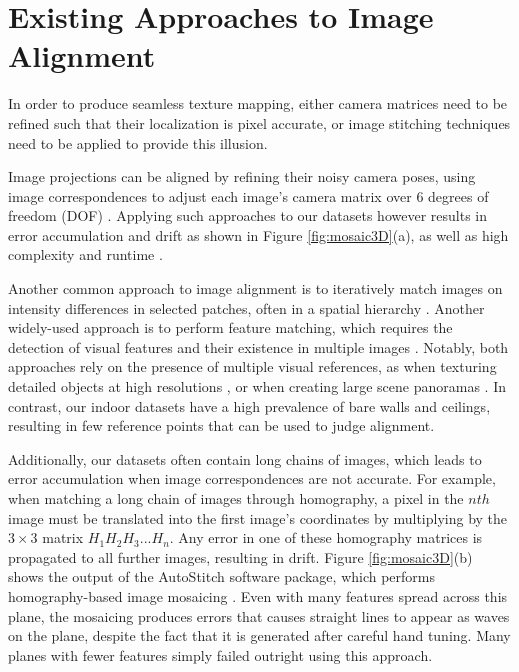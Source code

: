 \message{ !name(oldpaper.tex)}\documentclass[10pt,twocolumn,letterpaper]{article}
\begin{document}
\section{Existing Approaches to Image Alignment}
\label{sec:existingApproaches}
In order to produce seamless texture mapping, either camera matrices
need to be refined such that their localization is pixel accurate, or
image stitching techniques need to be applied to provide this
illusion.

Image projections can be aligned by refining their noisy camera poses,
using image correspondences to adjust each image's camera matrix over
6 degrees of freedom (DOF) \cite{coorg1997matching, liu2010indoor,
  shum2000systems, szeliski1997creating}. Applying such approaches to
our datasets however results in error accumulation and drift as shown
in Figure \ref{fig:mosaic3D}(a), as well as high complexity and
runtime \cite{liu2010indoor}.

Another common approach to image alignment is to
iteratively match images on intensity differences in selected patches,
often in a spatial hierarchy \cite{hager1998efficient,
  lucas1981iterative, shum2000systems, szeliski2006image}. Another
widely-used approach is to perform feature matching, which requires
the detection of visual features and their existence in multiple
images \cite{brown2007automatic, cho2003automatic,
  mikolajczyk2005performance, szeliski2006image,
  yun2003comprehensive}. Notably, both approaches rely on the presence
of multiple visual references, as when texturing detailed objects at
high resolutions \cite{bernardinimultiplescans, wangmultipleviews}, or
when creating large scene panoramas \cite{agarwalapanoramas,
  bernardinimultiplescans, debevecviewdependent,
  snavelyphototourism}. In contrast, our indoor datasets have a high
prevalence of bare walls and ceilings, resulting in few reference
points that can be used to judge alignment.

Additionally, our datasets often contain long chains of images, which
leads to error accumulation when image correspondences are not
accurate. For example, when matching a long chain of images through
homography, a pixel in the $nth$ image must be translated into the
first image's coordinates by multiplying by the $3\times3$ matrix $H_1
H_2 H_3 ... H_n$. Any error in one of these homography matrices is
propagated to all further images, resulting in drift. Figure
\ref{fig:mosaic3D}(b) shows the output of the AutoStitch software
package, which performs homography-based image mosaicing
\cite{autostitch}. Even with many features spread across this plane,
the mosaicing produces errors that causes straight lines to appear as
waves on the plane, despite the fact that it is generated after
careful hand tuning. Many planes with fewer features simply failed
outright using this approach.
\end{document}
